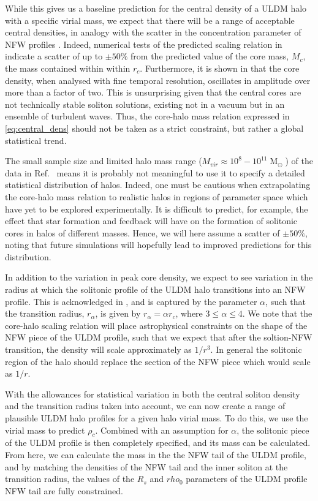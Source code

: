 \documentclass[a4paper,11pt]{article}
\begin{document}
While this gives us a baseline prediction for the central density of a ULDM halo with a specific virial mass, we expect that there will be a range of acceptable central densities, in analogy with the scatter in the concentration parameter of NFW profiles \cite{Maccio:2008pcd}. Indeed, numerical tests of the predicted scaling relation in \cite{Schive:2014hza} indicate a scatter of up to $\pm 50\%$ from the  predicted value of the core mass, $M_c$, the mass contained within  within $r_c$. Furthermore, it is shown in \cite{Veltmaat:2018dfz} that the core density, when analysed with fine temporal resolution, oscillates in amplitude over more than a factor of two. This is unsurprising given that the central cores are not technically stable soliton solutions, existing not in a vacuum but in an ensemble of turbulent waves. Thus, the core-halo mass relation expressed in \ref{eq:central_dens} should not be taken as a strict constraint, but rather a global statistical trend.

The small sample size and limited halo mass range ($ M_{vir} \approx 10^8-10^{11} \operatorname{M}_{\odot}$)  of the data in Ref.~\cite{Schive:2014hza} means it is probably not meaningful to use it to specify a detailed statistical distribution of halos. Indeed, one must be cautious when extrapolating the core-halo mass relation to realistic halos in regions of parameter space which have yet to be explored experimentally. It is difficult to predict, for example, the effect that star formation and feedback will have on the formation of solitonic cores in halos of different masses. Hence, we will here assume a scatter of $\pm 50\%$, noting that future simulations will hopefully lead to improved predictions for this distribution. 

In addition to the variation in peak core density, we expect to see variation in the radius at which the solitonic profile of the ULDM halo transitions into an NFW profile. This is acknowledged in \cite{Robles:2018fur}, and is captured by the parameter $\alpha$, such that the transition radius, $r_{\alpha}$, is given by $r_{\alpha} = \alpha r_c$, where $3 \leq \alpha \leq 4$. We note that the core-halo scaling relation will place astrophysical constraints on the shape of the NFW piece of the ULDM profile, such that we expect that after the soltion-NFW transition, the density will scale approximately as $1/r^3$. In general the solitonic region of the halo should replace the section of the NFW piece which would scale as $1/r$.  


With the allowances for statistical variation in both the central soliton density and the transition radius taken into account, we can now create a range of plausible ULDM halo profiles for a given halo virial mass. To do this, we use the virial mass to predict $\rho_c$. Combined with an assumption for $\alpha$, the solitonic piece of the ULDM profile is then completely specified, and its mass can be calculated. From here, we can calculate the mass in the the NFW tail of the ULDM profile, and by matching the densities of the NFW tail and the inner soliton at the transition radius, the values of the $R_s$ and $rho_0$ parameters of the ULDM profile NFW tail are fully constrained.  
\end{document}
